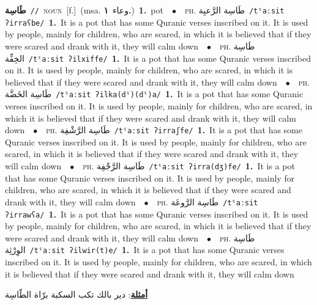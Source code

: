 \documentclass[10pt,a4paper,twoside]{article} %
\begin{document}
\begin{multicols}{2}
{\setlength\topsep{0pt}\textbf{\foreignlanguage{arabic}{طَاسِة}}\ {\color{gray}\texttt{//}\color{black}}\ \textsc{noun}\ [f.]\ \color{gray}(msa. \foreignlanguage{arabic}{وعاء}~\foreignlanguage{arabic}{\textbf{١.}})\color{black}\ \textbf{1.}~pot\ \ $\bullet$\ \ \textsc{ph.} \color{gray} \foreignlanguage{arabic}{طَاسِة الرَّعبِة}\color{black}\ {\color{gray}\texttt{/{\sffamily tˤaːsit ʔirraʕbe}/}\color{black}}\ \textbf{1.}~It is a pot that has some Quranic verses inscribed on it. It is used by people, mainly for children, who are scared, in which it is believed that if they were scared and drank with it, they will calm down\ \ $\bullet$\ \ \textsc{ph.} \color{gray} \foreignlanguage{arabic}{طَاسِة الخِفِّة}\color{black}\ {\color{gray}\texttt{/{\sffamily tˤaːsit ʔilxiffe}/}\color{black}}\ \textbf{1.}~It is a pot that has some Quranic verses inscribed on it. It is used by people, mainly for children, who are scared, in which it is believed that if they were scared and drank with it, they will calm down\ \ $\bullet$\ \ \textsc{ph.} \color{gray} \foreignlanguage{arabic}{طَاسِة الخَضَّة}\color{black}\ {\color{gray}\texttt{/{\sffamily tˤaːsit ʔilka(dˤ)(dˤ)a}/}\color{black}}\ \textbf{1.}~It is a pot that has some Quranic verses inscribed on it. It is used by people, mainly for children, who are scared, in which it is believed that if they were scared and drank with it, they will calm down\ \ $\bullet$\ \ \textsc{ph.} \color{gray} \foreignlanguage{arabic}{طَاسِة الرَّشْفِة}\color{black}\ {\color{gray}\texttt{/{\sffamily tˤaːsit ʔirraʃfe}/}\color{black}}\ \textbf{1.}~It is a pot that has some Quranic verses inscribed on it. It is used by people, mainly for children, who are scared, in which it is believed that if they were scared and drank with it, they will calm down\ \ $\bullet$\ \ \textsc{ph.} \color{gray} \foreignlanguage{arabic}{طَاسِة الرَّجْفِة}\color{black}\ {\color{gray}\texttt{/{\sffamily tˤaːsit ʔirra(dʒ)fe}/}\color{black}}\ \textbf{1.}~It is a pot that has some Quranic verses inscribed on it. It is used by people, mainly for children, who are scared, in which it is believed that if they were scared and drank with it, they will calm down\ \ $\bullet$\ \ \textsc{ph.} \color{gray} \foreignlanguage{arabic}{طَاسِة الرَّوعَة}\color{black}\ {\color{gray}\texttt{/{\sffamily tˤaːsit ʔirrawʕa}/}\color{black}}\ \textbf{1.}~It is a pot that has some Quranic verses inscribed on it. It is used by people, mainly for children, who are scared, in which it is believed that if they were scared and drank with it, they will calm down\ \ $\bullet$\ \ \textsc{ph.} \color{gray} \foreignlanguage{arabic}{طَاسِة الوِرْثِة}\color{black}\ {\color{gray}\texttt{/{\sffamily tˤaːsit ʔilwir(t)e}/}\color{black}}\ \textbf{1.}~It is a pot that has some Quranic verses inscribed on it. It is used by people, mainly for children, who are scared, in which it is believed that if they were scared and drank with it, they will calm down\  \begin{flushright}\color{gray}\foreignlanguage{arabic}{\textbf{\underline{\foreignlanguage{arabic}{أمثلة}}}: دير بالك تكب السكبة برّاة الطّاسِة}\end{flushright}\color{black}} \vspace{2mm}


\end{multicols}
\end{document}
